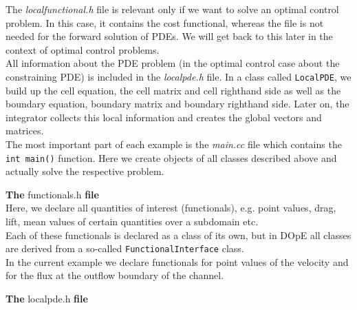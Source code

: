 The \textit{localfunctional.h} file is relevant only if we want to solve an optimal control problem. In this case, it contains the cost functional, whereas the file is not needed for the forward solution of PDEs. We will get back to this later in the context of optimal control problems.\\

All information about the PDE problem (in the optimal control case about the constraining PDE) is included in the \textit{localpde.h} file. In a class called \texttt{LocalPDE}, we build up the cell equation, the cell matrix and cell righthand side as well as the boundary equation, boundary matrix and boundary righthand side. Later on, the integrator collects this local information and creates the global vectors and matrices.\\

The most important part of each example is the \textit{main.cc} file which contains the \texttt{int main()} function. Here we create objects of all classes described above and actually solve the respective problem.\\
 
\vspace{0.2cm}

\textbf{The} functionals.h \textbf{file}\\

\vspace{0.2cm}
Here, we declare all quantities of interest (functionals), e.g. point values, drag, lift, mean values of certain quantities over a subdomain etc. \\
Each of these functionals is declared as a class of its own, but in DOpE all classes are derived from a so-called \texttt{FunctionalInterface} class.\\
In the current example we declare functionals for point values of the velocity and for the flux at the outflow boundary of the channel. \\

\vspace{0.2cm}

\textbf{The} localpde.h \textbf{file}\\

\vspace{0.2cm}

